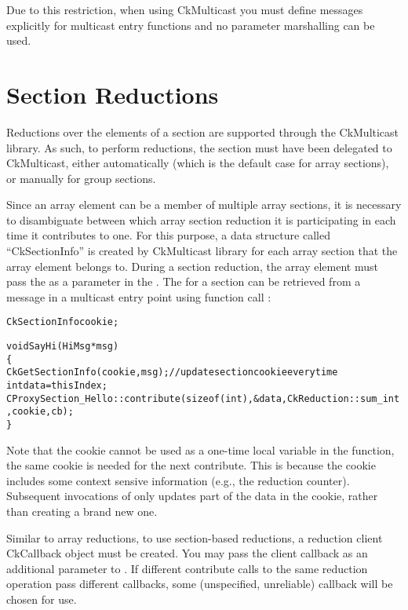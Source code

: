 Due to this restriction, when using CkMulticast you must define messages explicitly for multicast
entry functions and no parameter marshalling can be used.

\section{Section Reductions}

Reductions over the elements of a section are supported through the CkMulticast library.
As such, to perform reductions, the section must have been delegated to
CkMulticast, either automatically (which is the default case for array sections),
or manually for group sections.

Since an array element can be a member of multiple array sections,
it is necessary to disambiguate between which array
section reduction it is participating in each time it contributes to one. For this purpose, a data structure
called ``CkSectionInfo'' is created by CkMulticast library for each
array section that the array element belongs to.
During a section reduction, the array element must pass the
 as a parameter in the .
The  for a section can be retrieved
from a message in a multicast entry point using function call
:

\begin{alltt}
  CkSectionInfo cookie;

  void SayHi(HiMsg *msg)
  \{
    CkGetSectionInfo(cookie, msg);     // update section cookie every time
    int data = thisIndex;
    CProxySection_Hello::contribute(sizeof(int), &data, CkReduction::sum_int, cookie, cb);
  \}
\end{alltt}


Note that the cookie cannot be used as a one-time local variable in the 
function, the same cookie is needed for the next contribute. This is 
because the cookie includes some context sensive information (e.g., the 
reduction counter). Subsequent invocations of  only updates 
part of the data in the cookie, rather than creating a brand new one.

Similar to array reductions, to use section-based reductions, a
reduction client CkCallback object must be created. You may pass the
client callback as an additional parameter to . If
different contribute calls to the same reduction operation pass
different callbacks, some (unspecified, unreliable) callback will be
chosen for use. 

